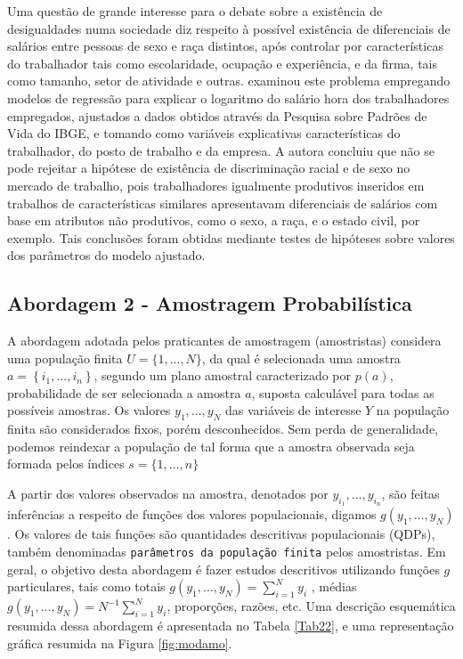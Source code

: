 \documentclass[]{book}
\theoremstyle{definition}
\theoremstyle{definition}
\theoremstyle{definition}
\theoremstyle{remark}
\begin{document}
Uma questão de grande interesse para o debate sobre a existência de
desigualdades numa sociedade diz respeito à possível existência de
diferenciais de salários entre pessoas de sexo e raça distintos, após
controlar por características do trabalhador tais como escolaridade,
ocupação e experiência, e da firma, tais como tamanho, setor de
atividade e outras. \citep{Rodrigues} examinou este problema empregando
modelos de regressão para explicar o logaritmo do salário hora dos
trabalhadores empregados, ajustados a dados obtidos através da Pesquisa
sobre Padrões de Vida do IBGE, e tomando como variáveis explicativas
características do trabalhador, do posto de trabalho e da empresa. A
autora concluiu que não se pode rejeitar a hipótese de existência de
discriminação racial e de sexo no mercado de trabalho, pois
trabalhadores igualmente produtivos inseridos em trabalhos de
características similares apresentavam diferenciais de salários com base
em atributos não produtivos, como o sexo, a raça, e o estado civil, por
exemplo. Tais conclusões foram obtidas mediante testes de hipóteses
sobre valores dos parâmetros do modelo ajustado.

\subsection{Abordagem 2 - Amostragem
Probabilística}\label{abordagem-2---amostragem-probabilistica}

A abordagem adotada pelos praticantes de amostragem (amostristas)
considera uma população finita \(U=\{1,\ldots ,N\}\), da qual é
selecionada uma amostra \(a=\left\{ i_{1},\ldots ,i_{n}\right\}\),
segundo um plano amostral caracterizado por \(p\left( a\right)\),
probabilidade de ser selecionada a amostra \(a\), suposta calculável
para todas as possíveis amostras. Os valores \(y_{1},\ldots ,y_{N}\) das
variáveis de interesse \(Y\) na população finita são considerados fixos,
porém desconhecidos. Sem perda de generalidade, podemos reindexar a
população de tal forma que a amostra observada seja formada pelos
índices \(s=\{1,\ldots,n\}\) \textbar{}

A partir dos valores observados na amostra, denotados por
\(y_{i_{1}},\ldots,y_{i_{n}}\), são feitas inferências a respeito de
funções dos valores populacionais, digamos
\(g\left( y_{1},\ldots ,y_{N}\right)\). Os valores de tais funções são
quantidades descritivas populacionais (QDPs), também denominadas
\texttt{parâmetros\ da\ população\ finita} pelos amostristas. Em geral,
o objetivo desta abordagem é fazer estudos descritivos utilizando
funções \(g\) particulares, tais como totais
\(g\left( y_{1},\ldots ,y_{N}\right) =\sum_{i=1}^{N}y_{i}\) , médias
\(g\left( y_{1},\ldots ,y_{N}\right) =N^{-1}\sum_{i=1}^{N}y_{i}\),
proporções, razões, etc. Uma descrição esquemática resumida dessa
abordagem é apresentada no Tabela \ref{Tab22}, e uma representação
gráfica resumida na Figura \ref{fig:modamo}.
\end{document}
